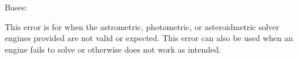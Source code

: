 \documentclass[letterpaper,11pt,english]{sphinxmanual}
\begin{document}
\begin{savenotes}\begin{fulllineitems}
\label{\detokenize{code/opihiexarata.library.error:opihiexarata.library.error.EngineError}}
\pysigstartsignatures
{}
\pysigstopsignatures
\sphinxAtStartPar
Bases: {\hyperref[\detokenize{code/opihiexarata.library.error:opihiexarata.library.error.ExarataException}]{}}

\sphinxAtStartPar
This error is for when the astrometric, photometric, or asteroid\sphinxhyphen{}metric
solver engines provided are not valid or expected. This error can also be
used when an engine fails to solve or otherwise does not work as
intended.

\end{fulllineitems}\end{savenotes}

\end{document}
